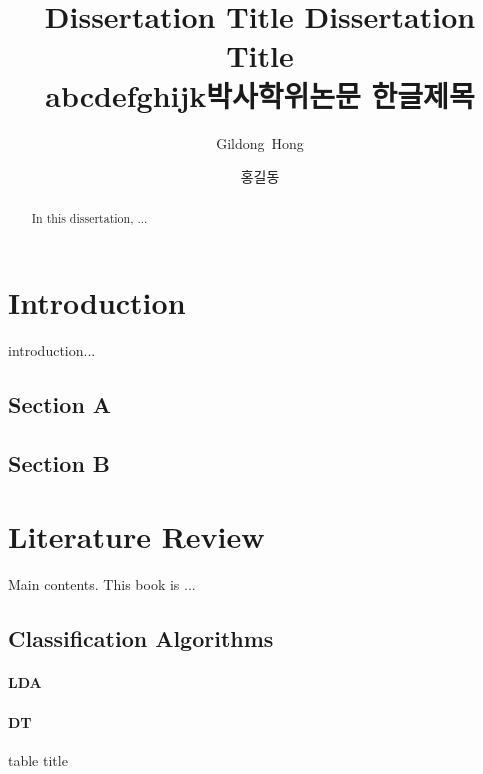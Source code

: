 \documentclass[oneside,phd]{snuthesis_utf8}
\title{Dissertation Title Dissertation Title \\abcdefghijk}
\title*{박사학위논문 한글제목}
\author{Gildong~Hong}
\author*{홍길동} %
\begin{document}
\makefrontcover
\makeapproval

\cleardoublepage
\makeagreement

\cleardoublepage
{}

\begin{abstract}
In this dissertation, ...

\end{abstract}


\tableofcontents
\cleardoublepage
{}

\listoftables
\cleardoublepage
{}

\listoffigures
\cleardoublepage
{}


\cleardoublepage
{}

\chapter{Introduction}

introduction...

\section{Section A}
\section{Section B}


\chapter{Literature Review}
Main contents.
This book \cite{bishop2006} is ...

\section{Classification Algorithms}

\subsubsection{LDA}
\subsubsection{DT}

\begin{table}[!hbp]
\caption{table title}
\end{table}
\end{document}
